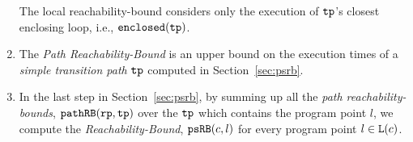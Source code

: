 \begin{enumerate}
    The local reachability-bound  considers only the execution of $\mathtt{tp}$'s closest enclosing loop, i.e., $\mathtt{enclosed}(\mathtt{tp})$.
    \item The \emph{Path Reachability-Bound} is an upper bound on the execution times of a \emph{simple transition path} $\mathtt{tp}$ computed in Section~\ref{sec:psrb}.
    \item In the last step in Section~\ref{sec:psrb}, by summing up all the \emph{path reachability-bounds}, $\mathtt{pathRB}(\mathtt{rp}, \mathtt{tp})$ over the $\mathtt{tp}$ which contains the program point $l$, we compute the \emph{Reachability-Bound}, $\mathtt{psRB}(c, l)$ for every program point $l \in \mathtt{L}(c)$.
\end{enumerate}